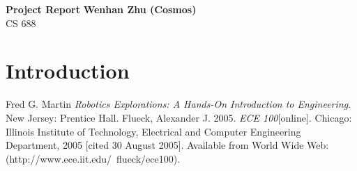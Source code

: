 \documentclass[letterpaper, 11pt]{article}
\begin{document}
\noindent
\large\textbf{Project Report} \hfill \textbf{Wenhan Zhu (Cosmos)} \\
\normalsize CS 688

\section*{Introduction}




\begin{thebibliography}{9}
     Fred G. Martin \emph{Robotics Explorations: A Hands-On Introduction to Engineering}. New Jersey: Prentice Hall.
      Flueck, Alexander J. 2005. \emph{ECE 100}[online]. Chicago: Illinois Institute of Technology, Electrical and Computer Engineering Department, 2005 [cited 30
    August 2005]. Available from World Wide Web: (http://www.ece.iit.edu/~flueck/ece100).
\end{thebibliography}
\end{document}
